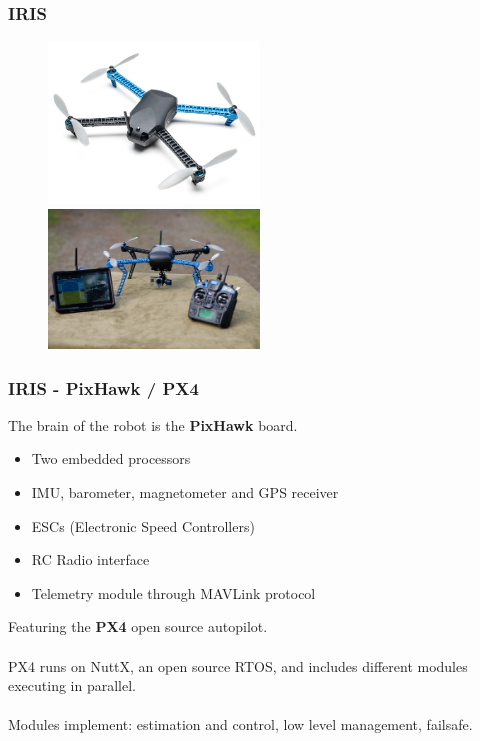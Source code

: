 \documentclass[xcolor=dvipsnames]{beamer}
\begin{document}
\begin{frame}
\frametitle{IRIS}
\begin{figure}
\centering
\includegraphics[width = 0.5\textwidth]{f/iris.jpg}
\includegraphics[width = 0.5\textwidth]{f/iris_planner.jpg}

\end{figure}

\end{frame}
\begin{frame}
\frametitle{IRIS - PixHawk / PX4}
The brain of the robot is the \textbf{PixHawk} board. 
\begin{itemize}
\item Two embedded processors
\item IMU, barometer, magnetometer  and GPS receiver
\item ESCs (Electronic Speed Controllers) 
\item RC Radio interface
\item Telemetry module through MAVLink protocol
\end{itemize}
Featuring the \textbf{PX4} open source autopilot. \\~\\
PX4 runs on NuttX, an open source RTOS, and includes different modules executing in parallel. 
\\~\\
Modules implement: estimation and control, low level management, failsafe.
\end{frame}
\end{document}
